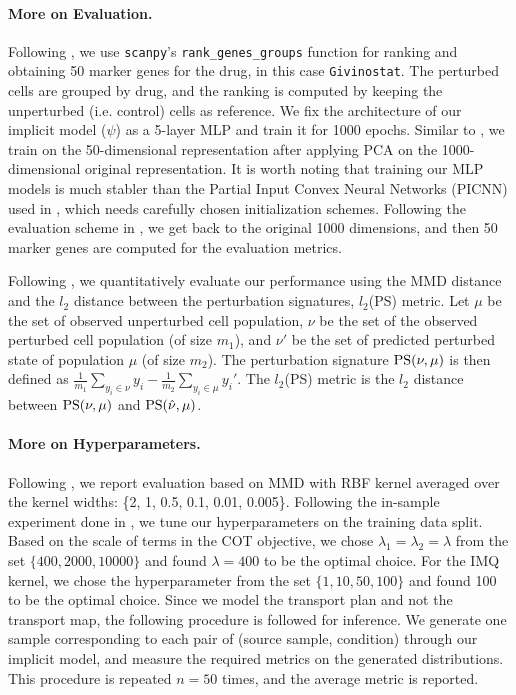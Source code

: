 \paragraph{More on Evaluation.} Following \cite{Cuturi22}, we use \texttt{scanpy}'s \citep{Wolf2018} \texttt{rank\_genes\_groups} function for ranking and obtaining 50 marker genes for the drug, in this case \texttt{Givinostat}. The perturbed cells are grouped by drug, and the ranking is computed by keeping the unperturbed (i.e. control) cells as reference. We fix the architecture of our implicit model ($\psi$) as a 5-layer MLP and train it for 1000 epochs. Similar to \cite{Cuturi22}, we train on the 50-dimensional representation after applying PCA on the 1000-dimensional original representation. It is worth noting that training our MLP models is much stabler than the Partial Input Convex Neural Networks (PICNN) used in \cite{Cuturi22}, which needs carefully chosen initialization schemes. Following the evaluation scheme in \cite{Cuturi22}, we get back to the original 1000 dimensions, and then 50 marker genes are computed for the evaluation metrics.

Following \cite{Cuturi22}, we quantitatively evaluate our performance using the MMD distance and the $l_2$ distance between the perturbation signatures, $l_2$(PS) metric. Let $\mu$ be the set of observed unperturbed cell population, $\nu$ be the set of the observed perturbed cell population (of size $m_1$), and $\nu'$ be the set of predicted perturbed state of population $\mu$ (of size $m_2$). The perturbation signature $\textup{PS}(\nu, \mu)$ is then defined as 
$\frac{1}{m_1}\sum_{y_i\in\nu}y_i-\frac{1}{m_2}\sum_{y_i\in\mu}y_i'$. The $l_2$(PS) metric is the $l_2$ distance between $\textup{PS}(\nu, \mu)$ and $\textup{PS}(\hat{\nu}, \mu)$. 

\paragraph{More on Hyperparameters.}
Following \cite{Cuturi22}, we report evaluation based on MMD with RBF kernel averaged over the kernel widths: \{2, 1, 0.5, 0.1, 0.01, 0.005\}. Following the in-sample experiment done in \cite{Cuturi22}, we tune our hyperparameters on the training data split. Based on the scale of terms in the COT objective, we chose $\lambda_1=\lambda_2=\lambda$ from the set $\{400, 2000, 10000\}$ and found $\lambda=400$ to be the optimal choice. For the IMQ kernel, we chose the hyperparameter from the set $\{1, 10, 50, 100\}$ and found 100 to be the optimal choice. Since we model the transport plan and not the transport map, the following procedure is followed for inference. We generate one sample corresponding to each pair of (source sample, condition) through our implicit model, and measure the required metrics on the generated distributions. This procedure is repeated $n=50$ times, and the average metric is reported.

